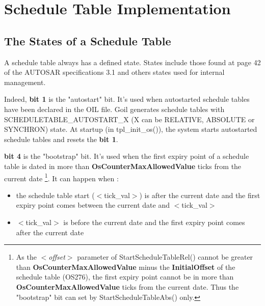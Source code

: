 


\newlength{\Li}
\newlength{\Liii}\settowidth{\Liii}{(bootstrap  )}
\newlength{\Lii}\settowidth{\Lii}{SCHEDULETABLE\_AUTOSTART }
\tabletail{ \hline } 
\tablelasttail{}


\chapter{Schedule Table Implementation}

\section{The States of a Schedule Table}

A schedule table always has a defined state. States include those found at page 42 of the AUTOSAR specifications 3.1 and others states used for internal management.

Indeed, \textbf{bit 1} is the "autostart" bit. It's used when autostarted schedule tables have been declared in the OIL file. Goil generates schedule tables with SCHEDULETABLE\_AUTOSTART\_X (X can be RELATIVE, ABSOLUTE or SYNCHRON) state. At startup (in tpl\_init\_os()), the system starts autostarted schedule tables and resets the \textbf{bit 1}.

\textbf{bit 4} is the "bootstrap" bit. It's used when the first expiry point of a schedule table is dated in more than \textbf{OsCounterMaxAllowedValue} ticks from the current date \footnote{As the \textit{$<$offset$>$} parameter of StartScheduleTableRel() cannot be greater than \textbf{OsCounterMaxAllowedValue} minus the \textbf{InitialOffset} of the schedule table (OS276), the first expiry point cannot be in more than \textbf{OsCounterMaxAllowedValue} ticks from the current date. Thus the "bootstrap" bit can set by StartScheduleTableAbs() only.}. It can happen when :
	\begin{itemize}
	\item the schedule table start ($<$tick\_val$>$) is after the current date and the first expiry point comes between the current date and $<$tick\_val$>$
	\item $<$tick\_val$>$ is before the current date and the first expiry point comes after the current date
	\end{itemize}

